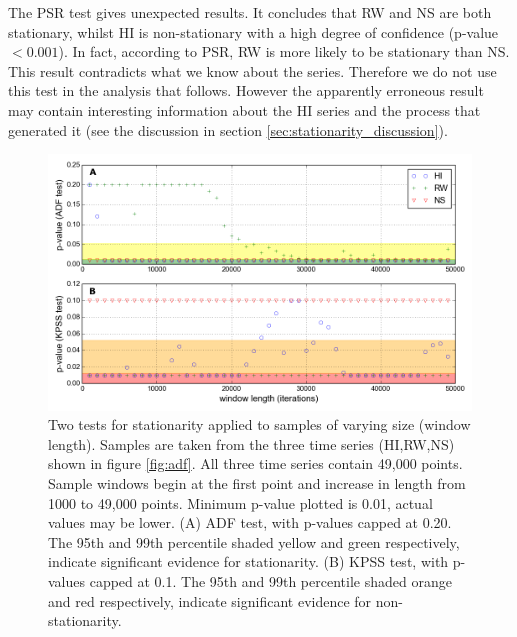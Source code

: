 The PSR test gives unexpected results. It concludes that RW and NS are both stationary, whilst HI is non-stationary with a high degree of confidence (p-value$<0.001$). In fact, according to PSR, RW is more likely to be stationary than NS. This result contradicts what we know about the series. Therefore we do not use this test in the analysis that follows. However the apparently erroneous result may contain interesting information about the HI series and the process that generated it (see the discussion in section \ref{sec:stationarity_discussion}). 




\begin{figure}[h!]
	\centering
	\includegraphics[width=0.80\linewidth]{"./chapters/chapter04b/figures/Rtests/stat_tests_v_wl"}
     \caption{Two tests for stationarity applied to samples of varying size (window length). Samples are taken from the three time series (HI,RW,NS) shown in figure \ref{fig:adf}. All three time series contain 49,000 points. Sample windows begin at the first point and increase in length from 1000 to 49,000 points. Minimum p-value plotted is 0.01, actual values may be lower. (A) ADF test, with p-values capped at 0.20. The 95th and 99th percentile shaded yellow and green respectively, indicate significant evidence for stationarity. (B) KPSS test, with p-values capped at 0.1. The 95th and 99th percentile shaded orange and red respectively, indicate significant evidence for non-stationarity.} 
     \label{fig:stat_tests_v_wl}   
\end{figure}

